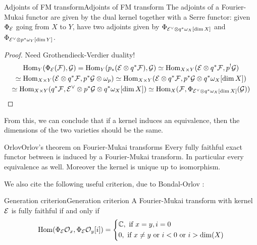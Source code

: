 \begin{proposition}{Adjoints of FM transform}{Adjoints of FM transform}
    The adjoints of a Fourier-Mukai functor are given by the dual kernel together with a Serre functor: given $\Phi_{\mathcal{E}}$ going from $X$ to $Y$, have two adjoints given by $\Phi_{\mathcal{E}^\vee\otimes q^*\omega_{X}[\dim X]}$ and $\Phi_{\mathcal{E}^\vee\otimes p^* \omega_{Y}[\dim Y]}$.
\end{proposition}
\begin{proof}
 Need Grothendieck-Verdier duality!
\begin{gather*}
    \operatorname{Hom}_Y(\Phi_{\mathcal{E}}(\mathcal{F}),\mathcal{G})
        = \operatorname{Hom}_Y(p_*(\mathcal{E}\otimes q^*\mathcal{F}),\mathcal{G})
        \simeq \operatorname{Hom}_{X\times Y}(\mathcal{E}\otimes q^*\mathcal{F},p^!\mathcal{G}) \\
        \simeq \operatorname{Hom}_{X\times Y}(\mathcal{E}\otimes q^*\mathcal{F},p^*\mathcal{G}\otimes\omega_p)
        \simeq \operatorname{Hom}_{X\times Y}(\mathcal{E}\otimes q^*\mathcal{F},p^*\mathcal{G}\otimes q^*\omega_X[\dim X]) \\
        \simeq \operatorname{Hom}_{X\times Y}(q^*\mathcal{F},\mathcal{E}^\vee\otimes p^*\mathcal{G}\otimes q^* \omega_X[\dim X])
        \simeq \operatorname{Hom}_X(\mathcal{F},\Phi_{\mathcal{E}^\vee\otimes q^*\omega_X[\dim X]}(\mathcal{G}))
\end{gather*}
\end{proof}
From this, we can conclude that if a kernel induces an equivalence, then the dimensions of the two varieties should be the same.

\begin{theorem}{Orlov}{Orlov's theorem on Fourier-Mukai transforms}
    Every fully faithful exact functor between is induced by a Fourier-Mukai transform. In particular every equivalence as well. Moreover the kernel is unique up to isomorphism.
\end{theorem}

We also cite the following useful criterion, due to Bondal-Orlov \cite{bondal_semiorthogonal_1995}:
\begin{proposition}{Generation criterion}{Generation criterion}
    A Fourier-Mukai transform with kernel $\mathcal{E}$ is fully faithful if and only if \begin{gather*}
        \Hom (\Phi_\calE \O_x, \Phi_\calE \O_y[i])=\begin{cases*}
           \C, \text{ if }x=y, i=0\\
           0, \text{ if }x\neq y \text{ or } i<0 \text{ or } i> \dim(X)
        \end{cases*}
    \end{gather*}

\end{proposition}

